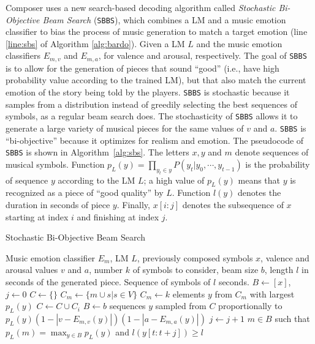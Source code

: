 Composer uses a new search-based decoding algorithm called \textit{Stochastic Bi-Objective Beam Search} (\texttt{SBBS}), which combines a LM and a music emotion classifier to bias the process of music generation to match a target emotion (line \ref{line:sbs} of Algorithm \ref{alg:bardo}). Given a LM $L$ and the music emotion classifiers $E_{m, v}$ and $E_{m, a}$, for valence and arousal, respectively. The goal of \texttt{SBBS} is to allow for the generation of pieces that sound ``good'' (i.e., have high probability value according to the trained LM), but that also match the current emotion of the story being told by the players. \texttt{SBBS} is stochastic because it samples from a distribution instead of greedily selecting the best sequences of symbols, as a regular beam search does. The stochasticity of \texttt{SBBS} allows it to generate a large variety of musical pieces for the same values of $v$ and $a$. \texttt{SBBS} is ``bi-objective'' because it optimizes for realism and emotion.
The pseudocode of \texttt{SBBS} is shown in Algorithm~\ref{alg:sbs}. The letters $x, y$ and $m$ denote sequences of musical symbols. Function $p_L(y) = \prod_{y_t \in y} P(y_t|y_0, \cdots, y_{t-1})$ is the probability of sequence $y$ according to the LM $L$; a high value of $p_L(y)$ means that $y$ is recognized as a piece of ``good quality'' by $L$. Function $l(y)$ denotes the duration in seconds of piece $y$. Finally, $x[i:j]$ denotes the subsequence of $x$ starting at index $i$ and finishing at index $j$.

\begin{algorithm}[t]
\caption{Stochastic Bi-Objective Beam Search}
\label{alg:sbs}
\begin{algorithmic}[1]
\REQUIRE Music emotion classifier $E_m$, LM $L$, previously composed symbols $x$, valence and arousal values $v$ and $a$, number $k$ of symbols to consider, beam size $b$, length $l$ in seconds of the generated piece.
\ENSURE Sequence of symbols of $l$ seconds.
\STATE $B \gets [x]$, $j \gets 0$ \label{line:sbs:init}
{} \label{line:sbs:stopping_condition}
    \STATE $C \gets \{\}$ \label{line:sbs:init_while}
        \STATE $C_m \gets \{m \cup s \vert s \in V\}$ \label{line:sbs:children}
        \STATE $C_m \gets k$ elements $y$ from $C_m$ with largest $p_L(y)$ \label{line:sbs:pruning_model}
        \STATE $C \gets C \cup C_i$ \label{line:sbs:total_children}
    \ENDFOR
    \STATE $B \gets b$ sequences $y$ sampled from $C$ proportionally to $p_L(y) (1 - |v - E_{m,v}(y)|) (1 - |a - E_{m,a}(y)|)$ \label{line:sbs:sample_next_beam}
    \STATE $j \gets j + 1$ \label{line:sbs:end_while}
\ENDWHILE
\RETURN $m \in B$ such that $p_L(m) = \max_{y \in B}p_L(y)$ and $l(y[t: t+j]) \geq l$ \label{line:sbs:return}
\end{algorithmic}
\end{algorithm}

